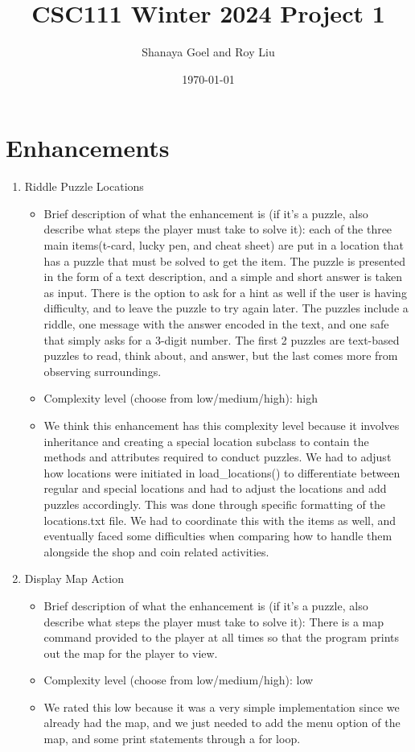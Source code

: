 \documentclass[11pt]{article}
\title{CSC111 Winter 2024 Project 1}
\author{Shanaya Goel and Roy Liu}
\date{\today}
\begin{document}
\maketitle

\section*{Enhancements}


\begin{enumerate}

\item Riddle Puzzle Locations
	\begin{itemize}
	\item Brief description of what the enhancement is (if it's a puzzle, also describe what steps the player must take to solve it): each of the three main items(t-card, lucky pen, and cheat sheet) are put in a location that has a puzzle that must be solved to get the item. The puzzle is presented in the form of a text description, and a simple and short answer is taken as input. There is the option to ask for a hint as well if the user is having difficulty, and to leave the puzzle to try again later. The puzzles include a riddle, one message with the answer encoded in the text, and one safe that simply asks for a 3-digit number. The first 2 puzzles are text-based puzzles to read, think about, and answer, but the last comes more from observing surroundings.
	\item Complexity level (choose from low/medium/high): high
	\item We think this enhancement has this complexity level because it involves inheritance and creating a special location subclass to contain the methods and attributes required to conduct puzzles. We had to adjust how locations were initiated in load\_locations() to differentiate between regular and special locations and had to adjust the locations and add puzzles accordingly. This was done through specific formatting of the locations.txt file. We had to coordinate this with the items as well, and eventually faced some difficulties when comparing how to handle them alongside the shop and coin related activities. 
	\end{itemize}
 
\item Display Map Action
	\begin{itemize}
	\item Brief description of what the enhancement is (if it's a puzzle, also describe what steps the player must take to solve it): There is a map command provided to the player at all times so that the program prints out the map for the player to view.
	\item Complexity level (choose from low/medium/high): low
	\item  We rated this low because it was a very simple implementation since we already had the map, and we just needed to add the menu option of the map, and some print statements through a for loop.
	\end{itemize}
 

\end{enumerate}
\end{document}
